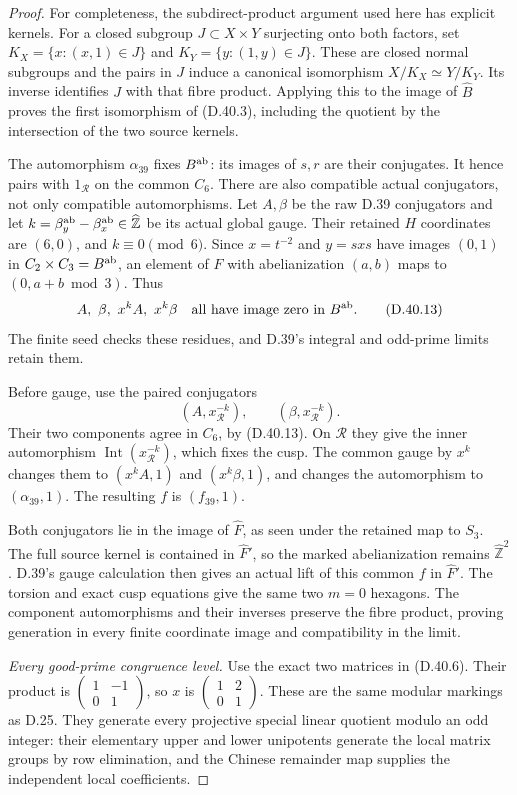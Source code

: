 \begin{proof}
For completeness, the subdirect-product argument
used here has explicit kernels. For a closed
subgroup $J\subset X\times Y$ surjecting onto both
factors, set
$K_X=\{x:(x,1)\in J\}$ and
$K_Y=\{y:(1,y)\in J\}$. These are closed normal
subgroups and the pairs in $J$ induce a canonical
isomorphism $X/K_X\simeq Y/K_Y$. Its inverse
identifies $J$ with that fibre product. Applying
this to the image of $\widehat B$ proves the first
isomorphism of (D.40.3), including the quotient
by the intersection of the two source kernels.

The automorphism $\alpha_{39}$ fixes $B^{\rm ab}$:
its images of $s,r$ are their conjugates. It hence
pairs with $1_{\mathcal R}$ on the common $C_6$.
There are also compatible actual conjugators, not
only compatible automorphisms. Let $A,\beta$ be
the raw D.39 conjugators and let
$k=\beta_y^{\rm ab}-\beta_x^{\rm ab}\in\widehat{\mathbb Z}$
be its actual global gauge. Their retained $H$
coordinates are $(6,0)$, and $k\equiv0\pmod6$.
Since $x=t^{-2}$ and $y=sxs$ have images $(0,1)$
in $C_2\times C_3=B^{\rm ab}$, an element of $F$
with abelianization $(a,b)$ maps to $(0,a+b\bmod3)$.
Thus
\[
 A,\ \beta,\ x^kA,\ x^k\beta
       \quad\hbox{all have image zero in }B^{\rm ab}.
                                                               \tag{D.40.13}
\]
The finite seed checks these residues, and D.39's
integral and odd-prime limits retain them.

Before gauge, use the paired conjugators
\[
 (A,x_{\mathcal R}^{-k}),\qquad
 (\beta,x_{\mathcal R}^{-k}).                            \tag{D.40.14}
\]
Their two components agree in $C_6$, by (D.40.13).
On $\mathcal R$ they give the inner automorphism
$\operatorname{Int}(x_{\mathcal R}^{-k})$, which
fixes the cusp. The common gauge by $x^k$ changes
them to $(x^kA,1)$ and $(x^k\beta,1)$, and changes
the automorphism to $(\alpha_{39},1)$.
The resulting $f$ is $(f_{39},1)$.

Both conjugators lie in the image of $\widehat F$,
as seen under the retained map to $S_3$.
The full source kernel is contained in $\widehat F'$,
so the marked abelianization remains
$\widehat{\mathbb Z}^2$. D.39's gauge calculation
then gives an actual lift of this common $f$ in
$\widehat F'$. The torsion and exact cusp equations
give the same two $m=0$ hexagons. The component
automorphisms and their inverses preserve the
fibre product, proving generation in every finite
coordinate image and compatibility in the limit.

\emph{Every good-prime congruence level.}
Use the exact two matrices in (D.40.6). Their
product is $\left(\begin{smallmatrix}1&-1\\0&1\end{smallmatrix}\right)$,
so $x$ is $\left(\begin{smallmatrix}1&2\\0&1\end{smallmatrix}\right)$.
These are the same modular markings as D.25.
They generate every projective special linear
quotient modulo an odd integer: their elementary
upper and lower unipotents generate the local
matrix groups by row elimination, and the Chinese
remainder map supplies the independent local
coefficients.


\end{proof}
